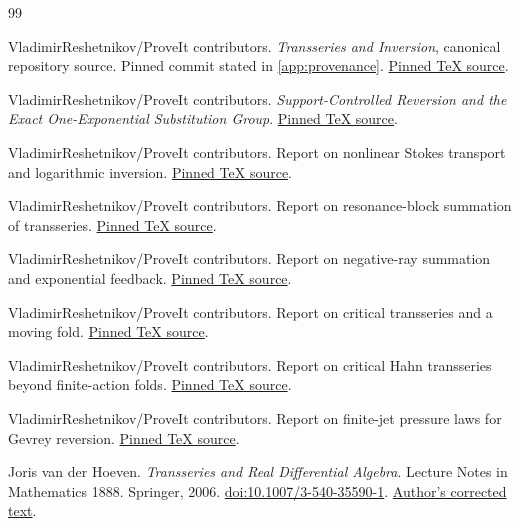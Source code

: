 \documentclass[11pt,a4paper]{article}
\numberwithin{equation}{section}
\theoremstyle{definition}
\theoremstyle{remark}
\newcommand{\repobase}{https://github.com/VladimirReshetnikov/ProveIt/tree/8e9cd6f00e0ac79c4425ff6abdfa64b497cf3f41/Analysis/Transseries/docs/series-and-transseries}
\begin{document}
\begin{thebibliography}{99}

VladimirReshetnikov/ProveIt contributors.
\emph{Transseries and Inversion}, canonical repository source.
Pinned commit stated in \cref{app:provenance}.
\href{\repobase/Transseries_And_Inversion/transseries_and_inversion.tex}
{Pinned TeX source}.

VladimirReshetnikov/ProveIt contributors.
\emph{Support-Controlled Reversion and the Exact One-Exponential
Substitution Group}.
\href{\repobase/Support_Controlled_Reversion_One_Exponential/reversion_and_one_exponential.tex}
{Pinned TeX source}.

VladimirReshetnikov/ProveIt contributors.
Report on nonlinear Stokes transport and logarithmic inversion.
\href{\repobase/Nonlinear_Stokes_Transport_Logarithmic_Inversion/article.tex}
{Pinned TeX source}.

VladimirReshetnikov/ProveIt contributors.
Report on resonance-block summation of transseries.
\href{\repobase/Resonance_Block_Summation_Transseries/article.tex}
{Pinned TeX source}.

VladimirReshetnikov/ProveIt contributors.
Report on negative-ray summation and exponential feedback.
\href{\repobase/Negative_Ray_Summation_Exponential_Feedback/article.tex}
{Pinned TeX source}.

VladimirReshetnikov/ProveIt contributors.
Report on critical transseries and a moving fold.
\href{\repobase/Critical_Transseries_Moving_Fold/article.tex}
{Pinned TeX source}.

VladimirReshetnikov/ProveIt contributors.
Report on critical Hahn transseries beyond finite-action folds.
\href{\repobase/Critical_Hahn_Transseries_Beyond_Finite_Action_Folds/article.tex}
{Pinned TeX source}.

VladimirReshetnikov/ProveIt contributors.
Report on finite-jet pressure laws for Gevrey reversion.
\href{\repobase/Finite_Jet_Pressure_Laws_Gevrey_Reversion/article.tex}
{Pinned TeX source}.

Joris van der Hoeven.
\emph{Transseries and Real Differential Algebra}.
Lecture Notes in Mathematics 1888. Springer, 2006.
\href{https://doi.org/10.1007/3-540-35590-1}
{doi:10.1007/3-540-35590-1}.
\href{https://www.texmacs.org/joris/ln/ln-corrected.pdf}
{Author's corrected text}.


\end{thebibliography}
\end{document}

